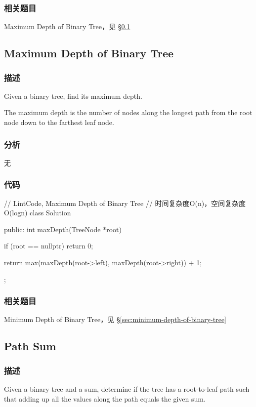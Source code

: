 \subsubsection{相关题目}
\begindot
\item Maximum Depth of Binary Tree，见 \S \ref{sec:maximum-depth-of-binary-tree}
\myenddot


\subsection{Maximum Depth of Binary Tree}
\label{sec:maximum-depth-of-binary-tree}


\subsubsection{描述}
Given a binary tree, find its maximum depth.

The maximum depth is the number of nodes along the longest path from the root node down to the farthest leaf node.


\subsubsection{分析}
无

\subsubsection{代码}

\begin{Code}
// LintCode, Maximum Depth of Binary Tree
// 时间复杂度O(n)，空间复杂度O(logn)
class Solution {
public:
    int maxDepth(TreeNode *root) {
        if (root == nullptr) return 0;

        return max(maxDepth(root->left), maxDepth(root->right)) + 1;
    }
};
\end{Code}


\subsubsection{相关题目}
\begindot
\item Minimum Depth of Binary Tree，见 \S \ref{sec:minimum-depth-of-binary-tree}
\myenddot


\subsection{Path Sum}
\label{sec:path-sum}


\subsubsection{描述}
Given a binary tree and a sum, determine if the tree has a root-to-leaf path such that adding up all the values along the path equals the given sum.


